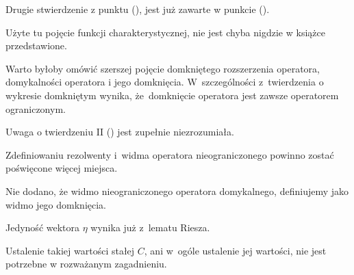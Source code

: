 \documentclass[a4paper,11pt]{article}
\begin{document}
\noindent
{} Drugie stwierdzenie z punktu (), jest już
  zawarte w punkcie ().

\vspace{\spaceFour}





\noindent
{} Użyte tu pojęcie funkcji charakterystycznej, nie jest
chyba nigdzie w książce przedstawione.

\vspace{\spaceFour}





\noindent
{} Warto byłoby omówić szerszej pojęcie domkniętego rozszerzenia
operatora, domykalności operatora i jego domknięcia. W~szczególności
z~twierdzenia o wykresie domkniętym wynika, że~domknięcie operatora jest
zawsze operatorem ograniczonym.

\vspace{\spaceFour}





\noindent
{} Uwaga o twierdzeniu II () jest zupełnie
niezrozumiała.

\vspace{\spaceFour}





\noindent
{} Zdefiniowaniu rezolwenty i~widma operatora nieograniczonego powinno
zostać poświęcone więcej miejsca.

\vspace{\spaceFour}





\noindent
{} Nie dodano, że widmo nieograniczonego operatora
domykalnego, definiujemy jako widmo jego domknięcia.

\vspace{\spaceFour}





\noindent
{} Jedyność wektora $\eta$ wynika już z~lematu Riesza.

\vspace{\spaceFour}





\noindent
{} Ustalenie takiej wartości stałej $C$, ani w~ogóle ustalenie jej
wartości, nie jest potrzebne w rozważanym zagadnieniu.
\end{document}
